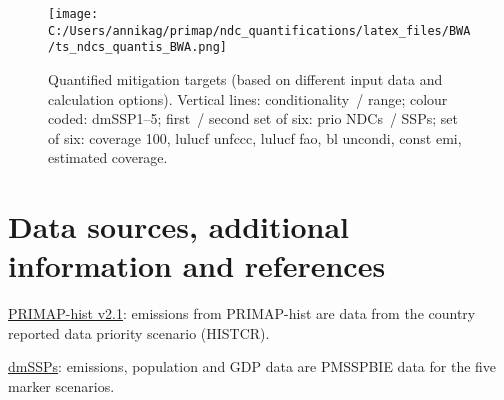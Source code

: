 \documentclass[12pt]{article}
\begin{document}
 \begin{figure}[H]
 \centering
 \texttt{[image: C:/Users/annikag/primap/ndc\_quantifications/latex\_files/BWA/ts\_ndcs\_quantis\_BWA.png]}
 \caption{Quantified mitigation targets (based on different input data and calculation options).
 Vertical lines: conditionality~/ range;
 colour coded: dmSSP1--5;
 first~/ second set of six: prio NDCs~/ SSPs;
 set of six: coverage 100, lulucf unfccc, lulucf fao, bl uncondi, const emi, estimated coverage.}
 \label{fig:miti}
 \end{figure}

 \newpage %
 \section{Data sources, additional information and references}
 \label{sec:dataSourcesRefs}

 \noindent \href{https://dataservices.gfz-potsdam.de/pik/showshort.php?id=escidoc:4736895}{PRIMAP-hist v2.1}: emissions from PRIMAP-hist are data from the country reported data priority scenario (HISTCR).

 \noindent \href{https://zenodo.org/record/3638137#.X2syXouxU2w}{dmSSPs}: emissions, population and GDP data are PMSSPBIE data for the five marker scenarios.
\end{document}
